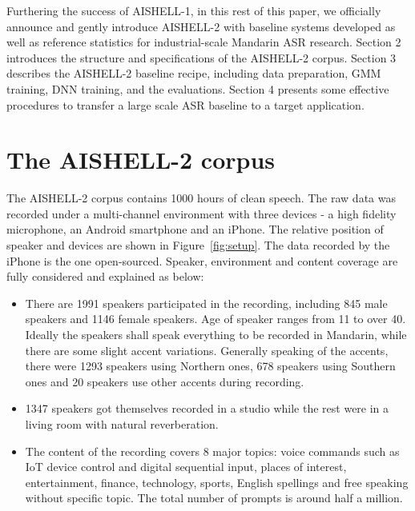 \documentclass[a4paper]{article}
\begin{document}
Furthering the success of AISHELL-1, in this rest of this paper, we officially announce and gently introduce AISHELL-2 with baseline systems developed as well as reference statistics for industrial-scale Mandarin ASR research.
%
Section 2 introduces the structure and specifications of the AISHELL-2 corpus. Section 3 describes the AISHELL-2
baseline recipe, including data preparation, GMM training, DNN training, and the
evaluations. Section 4 presents some effective procedures to transfer a large
scale ASR baseline to a target application.

\section{The AISHELL-2 corpus}

The AISHELL-2 corpus contains 1000 hours of clean speech. The raw data was recorded under a multi-channel environment with three devices - a high fidelity microphone, an Android smartphone and an iPhone. The relative position of speaker and devices are shown in Figure~\ref{fig:setup}. The data recorded by the iPhone is the one open-sourced. Speaker, environment and content coverage are fully considered and explained as below:
\begin{itemize}
\item There are 1991 speakers participated in the recording, including 845 male speakers and 1146 female speakers. Age of speaker ranges from 11 to over 40. Ideally the speakers shall speak everything to be recorded in Mandarin, while there are some slight accent variations. Generally speaking of the accents, there were 1293 speakers using Northern ones, 678 speakers using Southern ones and 20 speakers use other accents during recording. 
\item 1347 speakers got themselves recorded in a studio while the rest were in a living room with natural reverberation.
\item The content of the recording covers 8 major topics: voice commands such as IoT device control and digital sequential input, places of interest, entertainment, finance, technology, sports, English spellings and free speaking without specific topic. The total number of prompts is around half a million.
\end{itemize}
\end{document}
